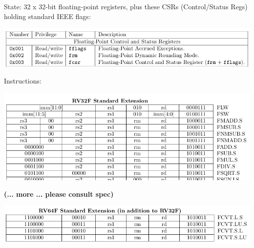 \documentclass{article}
\begin{document}
\begin{center}
  \begin{minipage}{9.5in}

  {\Large State: 32 x 32-bit floating-point registers, plus these CSRs
    (Control/Status Regs) holding standard IEEE flags:}

  \begin{center}
    \includegraphics[width=7in]{Figs/UNPRIV_riscv-spec-20191213_p136_CSRs_FD.png}
  \end{center}

  \vspace*{0.1in}

  {\Large Instructions:}

  \begin{center}
    \includegraphics[width=7in]{Figs/UNPRIV_riscv-spec-20191213_p133_RV32F.png}

    \vspace*{1ex}

    {\large\bf (... more ... please consult spec)}

    \vspace*{0.2in}

    \includegraphics[width=7in]{Figs/UNPRIV_riscv-spec-20191213_p133_RV64F.png}
  \end{center}
  \end{minipage}
\end{center}

\clearpage

\end{document}
